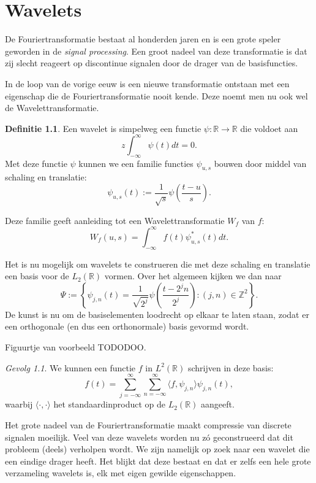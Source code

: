 \documentclass[11pt]{report}
\theoremstyle{plain}
\theoremstyle{definition}
\newtheorem{definitie}{Definitie}
\theoremstyle{remark}
\newtheorem*{gevolg}{Gevolg}
\newcommand{\R}{\mathbb{R}}
\newcommand{\Z}{\mathbb{Z}}
\begin{document}
\tableofcontents

\chapter{Wavelets}
De Fouriertransformatie bestaat al honderden jaren en is een grote speler geworden in de \emph{signal processing}. Een groot nadeel van deze transformatie is dat zij slecht reageert op discontinue signalen door de drager van de basisfuncties.

In de loop van de vorige eeuw is een nieuwe transformatie ontstaan met een eigenschap die de Fouriertransformatie nooit kende. Deze noemt men nu ook wel de Wavelettransformatie.

\begin{definitie}
Een wavelet is simpelweg een functie $\psi: \R \to \R$ die voldoet aan
\[
z  \int_{-\infty}^{\infty} \psi(t) dt = 0.
\]
Met deze functie $\psi$ kunnen we een familie functies $\psi_{u,s}$ bouwen door middel van schaling en translatie:
\[
  \psi_{u,s}(t) := \frac{1}{\sqrt{s}} \psi\left(\frac{t-u}{s}\right).
\]
\end{definitie}

Deze familie geeft aanleiding tot een Wavelettransformatie $W_f$ van $f$:
\[
  W_f(u,s) = \int_{-\infty}^\infty f(t) \psi^*_{u,s}(t) dt.
\]

Het is nu mogelijk om wavelets te construeren die met deze schaling en translatie een basis voor de $L_2(\R)$ vormen. Over het algemeen kijken we dan naar
\[
  \Psi := \left\{ \psi_{j,n}(t) = \frac{1}{\sqrt{2^j}} \psi\left( \frac{t - 2^jn}{2^j}\right) : (j,n) \in \Z^2 \right\}.
\]
De kunst is nu om de basiselementen loodrecht op elkaar te laten staan, zodat er een orthogonale (en dus een orthonormale) basis gevormd wordt. 

Figuurtje van voorbeeld TODODOO.

\begin{gevolg}We kunnen een functie $f$ in $L^2(\R)$ schrijven in deze basis:
\[
  f(t) = \sum_{j=-\infty}^{\infty} \sum_{n=-\infty}^{\infty} \langle f, \psi_{j,n} \rangle \psi_{j,n}(t),
\]
waarbij $\langle \cdot, \cdot \rangle$ het standaardinproduct op de $L_2(\R)$ aangeeft.
\end{gevolg}

Het grote nadeel van de Fouriertransformatie maakt compressie van discrete signalen moeilijk. Veel van deze wavelets worden nu z\'o geconstrueerd dat dit probleem (deels) verholpen wordt. We zijn namelijk op zoek naar een wavelet die een eindige drager heeft. Het blijkt dat deze bestaat en dat er zelfs een hele grote verzameling wavelets is, elk met eigen gewilde eigenschappen.
\end{document}
